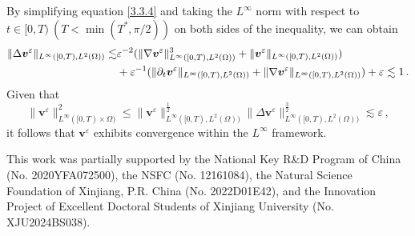 \documentclass[pdflatex,sn-mathphys-num]{sn-jnl}%
\theoremstyle{thmstyleone}%
\theoremstyle{thmstyletwo}%
\theoremstyle{thmstylethree}%
\theoremstyle{thmstyletwo}
\begin{document}
By simplifying equation \eqref{3.3.4} and taking the $L^\infty$ norm with respect to $t\in[0,T)~(T<\min(T^*,\pi/2))$ on both sides of the inequality, we can obtain
\begin{align*}\label{3.3.5}
	\lVert\Delta{\boldsymbol v}^{\varepsilon}\rVert_{L^\infty([0,T),{L}^2(\Omega))}
	\lesssim&
	\varepsilon^{-2}(\lVert
	\nabla{\boldsymbol v}^{\varepsilon}
	\rVert^{3}_{L^\infty([0,T),{L}^2(\Omega))}
	+\lVert
	{\boldsymbol v}^{\varepsilon}
	\rVert_{L^\infty([0,T),{L}^2(\Omega))})\notag\\
	&
	+\varepsilon^{-1}(\lVert
	\partial_{t} {\boldsymbol v}^{\varepsilon}
	\rVert_{L^\infty([0,T),{L}^2(\Omega))}+
	\lVert
	\nabla{\boldsymbol v}^{\varepsilon}
	\rVert_{L^\infty([0,T),{L}^2(\Omega))})+\varepsilon
	\lesssim1
	\,.
\end{align*}
Given that 
\begin{equation}
	\lVert{\boldsymbol v}^{\varepsilon}\rVert^2_{L^\infty([0,T)\times\Omega)}
	\leq
	\lVert{\boldsymbol v}^{\varepsilon}\rVert^{\frac12}_{L^\infty([0,T),{L}^2(\Omega))}
	\lVert\Delta{\boldsymbol v}^{\varepsilon}\rVert^{\frac32}_{L^\infty([0,T),{L}^2(\Omega))}
	\lesssim\varepsilon\,,
\end{equation}
it follows that \( {\boldsymbol v}^{\varepsilon} \) exhibits convergence within the \( L^\infty \) framework.


























\backmatter

%
%
%

This work was partially supported by the National Key R\&D Program of China (No. 2020YFA072500), the NSFC (No. 12161084), the Natural Science Foundation of Xinjiang, P.R. China
(No. 2022D01E42), and the Innovation Project of Excellent Doctoral Students of Xinjiang University (No. XJU2024BS038).
\end{document}

